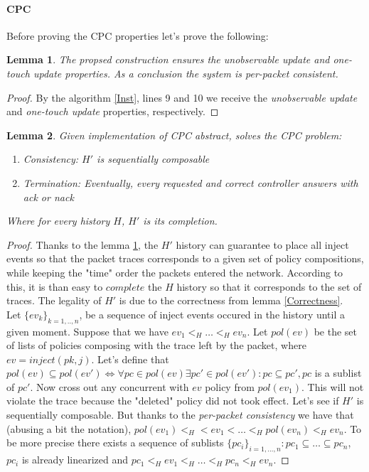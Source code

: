 \documentclass{article}
\newtheorem{lemma}{Lemma}
\theoremstyle{remark}
\begin{document}
\paragraph{CPC} \label{consistencyPC}
Before proving the CPC properties let's prove the following:
\begin{lemma}\label{per-packet consistency} The propsed construction ensures the \emph{unobservable update} and \emph{one-touch update} properties. As a conclusion the system is \emph{per-packet consistent}.
\end{lemma}
\begin{proof}
By the algorithm \ref{Inst}, lines 9 and 10 we receive the \emph{unobservable update} and \emph{one-touch update} properties, respectively.
\end{proof}
\begin{lemma}
Given implementation of CPC abstract, solves the CPC problem:
\begin{enumerate}
\item Consistency: \emph{$H'$ is sequentially composable}
\item Termination: \emph{Eventually, every requested and correct controller answers with} ack or nack
\end{enumerate}
Where for every history $H$, $H'$ is its completion.
\end{lemma}
\begin{proof}
Thanks to the lemma \ref{per-packet consistency}, the $H'$ history can guarantee to place all inject events so that the packet traces corresponds to a given set of policy compositions, while keeping the "time" order the packets entered the network. According to this, it is than easy to $complete$ the $H$ history so that it corresponds to the set of traces.
The legality of $H'$ is due to the correctness from lemma \ref{Correctness}. \\
Let $\lbrace ev_k\rbrace_{k=1,..,n}$, be a sequence of 
inject events occured in the history until a given moment. Suppose 
that we have $ev_1<_H\ldots <_Hev_n$.
Let $pol(ev)$ be the set of lists of policies composing with the trace left by the packet, where $ev=inject(pk,j)$. Let's define that $pol(ev)\subseteq pol(ev')\Leftrightarrow \forall pc\in pol(ev) \exists pc'\in pol(ev'): pc\subseteq pc',pc$ is a sublist of $pc'$. Now cross out any concurrent with $ev$ policy from $pol(ev_1)$. This will not violate the trace because the "deleted" policy did not took effect. 
Let's see if $H'$ is sequentially composable. But thanks to the \emph{per-packet consistency} we have that (abusing a bit the notation), $pol(ev_1)<_H<ev_1<\ldots <_H pol(ev_n)<_Hev_n$. To be more precise there exists a sequence of sublists $\lbrace pc_i\rbrace_{i=1,\ldots, n}: pc_1\subseteq\ldots\subseteq pc_n$,  $pc_i$ is already linearized and $pc_1<_H ev_1<_H\ldots <_H pc_n<_H ev_n$. 
\end{proof}
\end{document}
